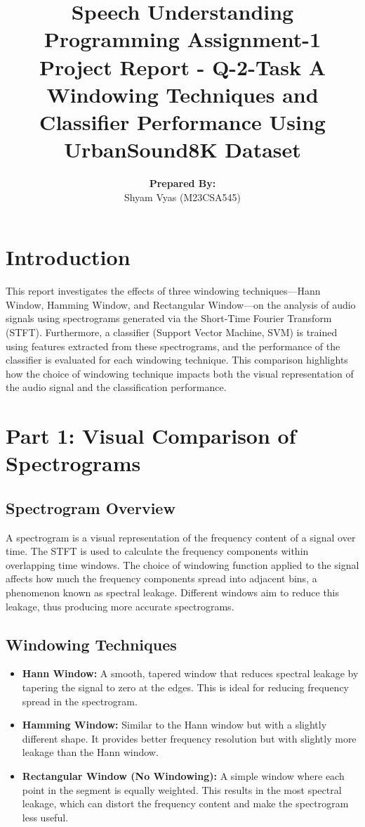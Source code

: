 \documentclass[a4paper,12pt]{article}
\title{\textbf{Speech Understanding}\\
\bigskip
\bigskip
\bigskip
{Programming Assignment-1}\\
\bigskip\bigskip\bigskip
{Project Report - Q-2-Task A} 
\bigskip\bigskip\bigskip\\
    {Windowing Techniques and Classifier Performance Using UrbanSound8K Dataset}
}
\author{\textbf{Prepared By:}\\Shyam Vyas (M23CSA545)}
\begin{document}
\maketitle

\newpage
\tableofcontents
\newpage

\newpage
\section{Introduction}
This report investigates the effects of three windowing techniques—Hann Window, Hamming Window, and Rectangular Window—on the analysis of audio signals using spectrograms generated via the Short-Time Fourier Transform (STFT). Furthermore, a classifier (Support Vector Machine, SVM) is trained using features extracted from these spectrograms, and the performance of the classifier is evaluated for each windowing technique. This comparison highlights how the choice of windowing technique impacts both the visual representation of the audio signal and the classification performance.
\newpage
\section{Part 1: Visual Comparison of Spectrograms}

\subsection{Spectrogram Overview}
A spectrogram is a visual representation of the frequency content of a signal over time. The STFT is used to calculate the frequency components within overlapping time windows. The choice of windowing function applied to the signal affects how much the frequency components spread into adjacent bins, a phenomenon known as spectral leakage. Different windows aim to reduce this leakage, thus producing more accurate spectrograms.

\subsection{Windowing Techniques}
\begin{itemize}
    \item \textbf{Hann Window:} A smooth, tapered window that reduces spectral leakage by tapering the signal to zero at the edges. This is ideal for reducing frequency spread in the spectrogram.

\item \textbf{Hamming Window:} Similar to the Hann window but with a slightly different shape. It provides better frequency resolution but with slightly more leakage than the Hann window.

\item \textbf{Rectangular Window (No Windowing):} A simple window where each point in the segment is equally weighted. This results in the most spectral leakage, which can distort the frequency content and make the spectrogram less useful.
\end{itemize}
\end{document}
